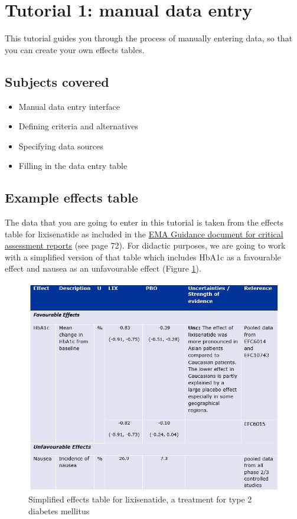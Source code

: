 \documentclass[00_mcda_tutorial.tex]{subfiles}
\begin{document}
\section*{Tutorial 1: manual data entry}
\addtocounter{section}{1}

This tutorial guides you through the process of manually entering data, so that you can create your own effects tables.

\subsection*{Subjects covered}
\begin{itemize}
\item Manual data entry interface
\item Defining criteria and alternatives
\item Specifying data sources
\item Filling in the data entry table
\end{itemize}

\subsection*{Example effects table}
The data that you are going to enter in this tutorial is taken from the effects table for lixisenatide as included in the \href{https://www.ema.europa.eu/documents/template-form/day-80-assessment-report-overview-d120-loq-template-guidance-rev-0718_en.doc}{EMA Guidance document for critical assessment reports} (see page 72).  For didactic purposes, we are going to work with a simplified version of that table which includes HbA1c as a favourable effect and nausea as an unfavourable effect (Figure \ref{fig:lixisenatide_effect_table}).

\begin{figure}[!h]
    \centering
	\includegraphics[width=\textwidth]{fig/lixiEffectTable.png}
    \caption{Simplified effects table for lixisenatide, a treatment for type 2 diabetes mellitus}
	\label{fig:lixisenatide_effect_table}
\end{figure}
\end{document}
